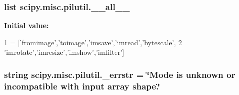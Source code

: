 \subsubsection[{\+\_\+\+\_\+all\+\_\+\+\_\+}]{\setlength{\rightskip}{0pt plus 5cm}list scipy.\+misc.\+pilutil.\+\_\+\+\_\+all\+\_\+\+\_\+}\label{namespacescipy_1_1misc_1_1pilutil_a5023f2f629ba6f93e9c3c5e0a8f17816}
{\bfseries Initial value\+:}
\begin{DoxyCode}
1 = [\textcolor{stringliteral}{'fromimage'},\textcolor{stringliteral}{'toimage'},\textcolor{stringliteral}{'imsave'},\textcolor{stringliteral}{'imread'},\textcolor{stringliteral}{'bytescale'},
2            \textcolor{stringliteral}{'imrotate'},\textcolor{stringliteral}{'imresize'},\textcolor{stringliteral}{'imshow'},\textcolor{stringliteral}{'imfilter'}]
\end{DoxyCode}
\hypertarget{namespacescipy_1_1misc_1_1pilutil_a269c47cd994f4df599a608942d524fc5}{}
\subsubsection[{\+\_\+errstr}]{\setlength{\rightskip}{0pt plus 5cm}string scipy.\+misc.\+pilutil.\+\_\+errstr = \char`\"{}Mode is unknown or incompatible with {\bf input} array shape.\char`\"{}}\label{namespacescipy_1_1misc_1_1pilutil_a269c47cd994f4df599a608942d524fc5}

